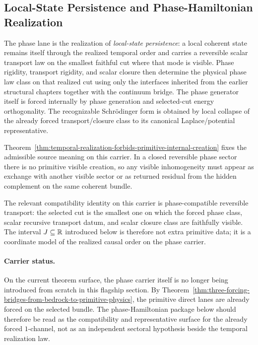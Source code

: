 \subsection{Local-State Persistence and Phase-Hamiltonian Realization}
\label{sec:flagship-quantum}

The phase lane is the realization of \emph{local-state persistence}: a local
coherent state remains itself through the realized temporal order and carries a
reversible scalar transport law on the smallest faithful cut where that mode
is visible. Phase rigidity, transport rigidity, and scalar closure then
determine the physical phase law class on that realized cut using only the
interfaces inherited from the earlier structural chapters together with the
continuum bridge. The phase generator itself is forced
internally by phase generation and selected-cut energy orthogonality. The
recognizable Schr\"odinger form is obtained by local collapse of the already
forced transport/closure class to its canonical Laplace/potential
representative.

Theorem~\ref{thm:temporal-realization-forbids-primitive-internal-creation}
fixes the admissible source meaning on this carrier. In a closed reversible
phase sector there is no primitive visible creation, so any visible
inhomogeneity must appear as exchange with another visible sector or as
returned residual from the hidden complement on the same coherent bundle.

The relevant compatibility identity on this carrier is phase-compatible
reversible transport: the selected cut is the smallest one on which the forced
phase class, scalar recursive transport datum, and scalar closure class are
faithfully visible. The interval \(J\subseteq\mathbb{R}\) introduced below is
therefore not extra primitive data; it is a coordinate model of the realized
causal order on the phase carrier.

\paragraph{Carrier status.}
On the current theorem surface, the phase carrier itself is no longer being
introduced from scratch in this flagship section. By
Theorem~\ref{thm:three-forcing-bridges-from-bedrock-to-primitive-physics}, the
primitive direct lanes are already forced on the selected bundle. The
phase-Hamiltonian package below should therefore be read as the compatibility
and representative surface for the already forced \(1\)-channel, not as an
independent sectoral hypothesis beside the temporal realization law.


